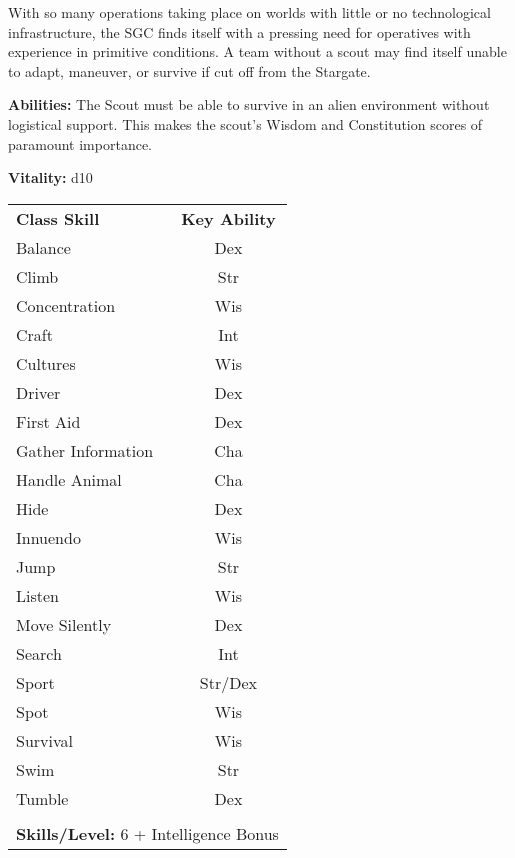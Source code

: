 \begin{multicols}{2}

With so many operations taking place on worlds with little or no technological infrastructure, the SGC finds itself with a pressing need for operatives with experience in primitive conditions. A team without a scout may find itself unable to adapt, maneuver, or survive if cut off from the Stargate.

\textbf{Abilities:} The Scout must be able to survive in an alien environment without logistical support. This makes the scout's Wisdom and Constitution scores of paramount importance.

\textbf{Vitality:} d10

\end{multicols}

\begin{table}[htb]
\raggedright
\begin{tabular}{l c}
\textbf{Class Skill} & \textbf{Key Ability}\\

Balance & Dex\\
Climb & Str\\
Concentration & Wis\\
Craft & Int\\
Cultures & Wis\\
Driver & Dex\\
First Aid & Dex\\
Gather Information & Cha\\
Handle Animal & Cha\\
Hide & Dex\\
Innuendo & Wis\\
Jump & Str\\
Listen & Wis\\
Move Silently & Dex\\
Search & Int\\
Sport & Str/Dex\\
Spot & Wis\\
Survival & Wis\\
Swim & Str\\
Tumble & Dex\\

\multicolumn{2}{l}{\cellcolor{white}}\\
\multicolumn{2}{l}{\cellcolor{white}\textbf{Skills/Level:} 6 + Intelligence Bonus}\\
\end{tabular}
\end{table}

